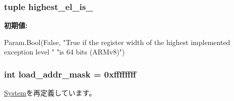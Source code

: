 \hypertarget{classArmSystem_1_1ArmSystem_a4be10756962c1bcc437a2110f0c0fe80}{
\subsubsection[{highest\_\-el\_\-is\_\-64}]{\setlength{\rightskip}{0pt plus 5cm}tuple highest\_\-el\_\-is\_}}
\label{classArmSystem_1_1ArmSystem_a4be10756962c1bcc437a2110f0c0fe80}
{\bfseries 初期値:}
\begin{DoxyCode}
Param.Bool(False,
        "True if the register width of the highest implemented exception level "
        "is 64 bits (ARMv8)")
\end{DoxyCode}
\hypertarget{classArmSystem_1_1ArmSystem_abd9c5cc6b7da624a69344d571bab1038}{
\subsubsection[{load\_\-addr\_\-mask}]{\setlength{\rightskip}{0pt plus 5cm}int load\_\-addr\_\-mask = 0xffffffff}}
\label{classArmSystem_1_1ArmSystem_abd9c5cc6b7da624a69344d571bab1038}


\hyperlink{classSystem_1_1System_ae97427a4073448718c4d7c3df3b53143}{System}を再定義しています。

